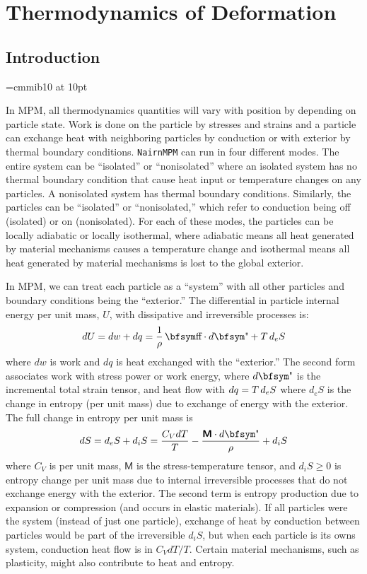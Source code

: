 \documentclass[11pt]{book}
\newcommand{\tens}[1]{\boldsymbol{\mathsf{#1}}}
\begin{document}
\chapter{Thermodynamics of Deformation}

\section{Introduction}

\font\bfsym=cmmib10 at 10pt
\def\st{{\hbox{\bfsym\char'033}}}
\def\et{{\hbox{\bfsym\char'042}}}

In MPM, all thermodynamics quantities will vary with position by depending on particle state. Work is done on the particle by stresses and strains and a particle can exchange heat with neighboring particles by conduction or with exterior by thermal boundary conditions. {\tt NairnMPM} can run in four different modes. The entire system can be ``isolated'' or ``nonisolated'' where an isolated system has no thermal boundary condition that cause heat input or temperature changes on any particles. A nonisolated system has thermal boundary conditions. Similarly, the particles can be ``isolated'' or ``nonisolated,'' which refer to conduction being off (isolated) or on (nonisolated). For each of these modes, the particles can be locally adiabatic or locally isothermal, where adiabatic means all heat generated by material mechanisms causes a temperature change and isothermal means all heat generated by material mechanisms is lost to the global exterior.

In MPM, we can treat each particle as a ``system'' with all other particles and boundary conditions being the ``exterior.''
The differential in particle internal energy per unit mass, $U$, with dissipative and irreversible processes is:
\begin{equation}%
      dU = dw + dq = {1\over \rho}\thinspace \st\cdot d\et + T \thinspace d_eS
\end{equation}%
where $dw$ is work and $dq$ is heat exchanged with the ``exterior.'' The second form associates work with stress power or work energy, where $d\et$ is the incremental total strain tensor, and heat flow with $dq = T \thinspace d_eS$ where $d_eS$ is the change in entropy (per unit mass) due to exchange of energy with the exterior. The full change in entropy per unit mass is
\begin{equation}%
      dS = d_eS + d_iS = {C_V dT\over T} - {\tens{M}\cdot d\et\over \rho} + d_iS
\end{equation}%
where $C_V$ is per unit mass, $\tens{M}$ is the stress-temperature tensor, and $d_iS\ge0$ is entropy change per unit mass due to internal irreversible processes that do not exchange energy with the exterior. The second term is entropy production due to expansion or compression (and occurs in elastic materials). If all particles were the system (instead of just one particle), exchange of heat by conduction between particles would be part of the irreversible $d_iS$, but when each particle is its owns system, conduction heat flow is in $C_VdT/T$. Certain material mechanisms, such as plasticity, might also contribute to heat and entropy.
\end{document}
